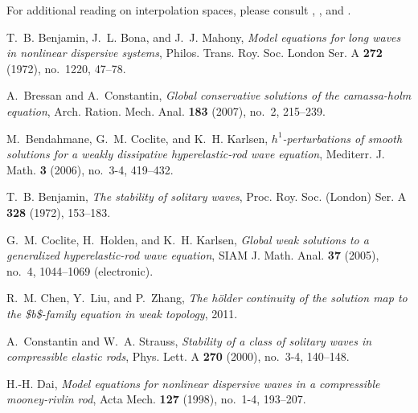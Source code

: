 \documentclass[12pt,reqno]{amsart}
\numberwithin{equation}{section}  %
\numberwithin{figure}{section}
\begin{document}
%
%
For additional reading on interpolation spaces, please consult
\cite{Taylor:1995kx}, \cite{bergh1976interpolation}, and \cite{Bennett:1988ys}.
%
%
%
\providecommand{\bysame}{\leavevmode\hbox to3em{\hrulefill}\thinspace}
\providecommand{\MR}{\relax\ifhmode\unskip\space\fi MR }
\providecommand{\MRhref}[2]{%
  \href{http://www.ams.org/mathscinet-getitem?mr=#1}{#2}
}
\providecommand{\href}[2]{#2}
\begin{thebibliography}{HKM09}

T.~B. Benjamin, J.~L. Bona, and J.~J. Mahony, \emph{Model equations for long
  waves in nonlinear dispersive systems}, Philos. Trans. Roy. Soc. London Ser.
  A \textbf{272} (1972), no.~1220, 47--78.

A.~Bressan and A.~Constantin, \emph{Global conservative solutions of the
  camassa-holm equation}, Arch. Ration. Mech. Anal. \textbf{183} (2007), no.~2,
  215--239.

M.~Bendahmane, G.~M. Coclite, and K.~H. Karlsen,
  \emph{$h^1$-perturbations of smooth solutions for a weakly dissipative
  hyperelastic-rod wave equation}, Mediterr. J. Math. \textbf{3} (2006),
  no.~3-4, 419--432.

T.~B. Benjamin, \emph{The stability of solitary waves}, Proc. Roy. Soc.
  (London) Ser. A \textbf{328} (1972), 153--183.

G.~M. Coclite, H.~Holden, and K.~H. Karlsen, \emph{Global weak solutions to a
  generalized hyperelastic-rod wave equation}, SIAM J. Math. Anal. \textbf{37}
  (2005), no.~4, 1044--1069 (electronic).

R.~M. Chen, Y.~Liu, and P.~Zhang, \emph{The h{\"o}lder continuity of the
  solution map to the {\$}b{\$}-family equation in weak topology}, 2011.

A.~Constantin and W.~A. Strauss, \emph{Stability of a class of solitary waves
  in compressible elastic rods}, Phys. Lett. A \textbf{270} (2000), no.~3-4,
  140--148.

H.-H. Dai, \emph{Model equations for nonlinear dispersive waves in a
  compressible mooney-rivlin rod}, Acta Mech. \textbf{127} (1998), no.~1-4,
  193--207.


\end{thebibliography}
\end{document}
